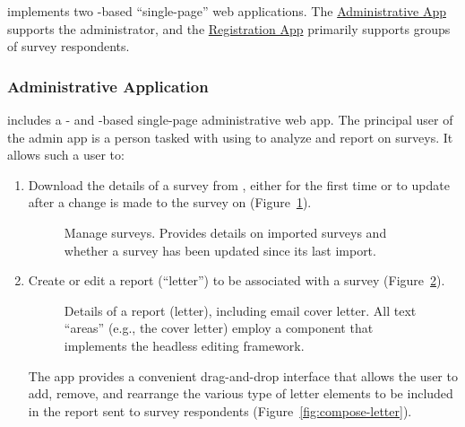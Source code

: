 \documentclass{article}
\begin{document}
\caper{} implements two \vue-based ``single-page'' web applications.
The \hyperref[sec:admin-app]{Administrative App}
supports the \caper{} administrator,
and the \hyperref[sec:group-app]{Registration App}
primarily supports groups of survey respondents.

\subsubsection{Administrative Application}
\label{sec:admin-app}

\caper{} includes a \vue{}- and \vuetify{}-based
single-page
administrative web app.
The principal user of the admin app
is a person tasked with using \caper{}
to analyze and report on \qual{} surveys.
It allows such a user to:
\begin{enumerate}
\item
  Download the details of a survey from \qual{},
  either for the first time or to update \caper{} after a change is made to the survey on \qual{}
  (Figure~\ref{fig:manage-qualtrics}).


  \begin{figure}
    \centering
    \caption{
      Manage \qual{} surveys.
      Provides details on imported surveys
      and whether a survey has been updated since its last import.
    }
    \label{fig:manage-qualtrics}
  \end{figure}
\item
  Create or edit a report (``letter'') to be associated with a survey
  (Figure~\ref{fig:letter-details}).

  
  \begin{figure}
    \centering
    \caption{
      Details of a report (letter), including email cover letter.
      All text ``areas'' (e.g., the cover letter)
      employ a \caper{} component that implements
      the \tiptap{} headless editing framework.
    }
    \label{fig:letter-details}
  \end{figure}

  The app provides a convenient drag-and-drop interface
  that allows the user to add, remove, and rearrange the various type of
  letter elements to be included in the report sent to survey respondents
  (Figure~\ref{fig:compose-letter}).


\end{enumerate}
\end{document}

